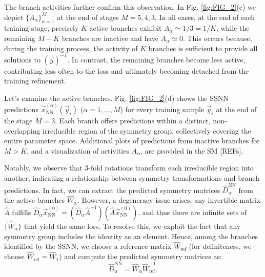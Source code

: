The branch activities further confirm this observation. In Fig. \ref{fig:FIG_2}(c) we depict $\{ A_{\alpha} \}_{\alpha = 1}^M$ at the end of stages $M = 5,4,3$.  In all cases, at the end of each training stage, precisely $K$ active branches exhibit $A_{\alpha} \simeq 1/3 = 1/K$, while the remaining $M-K$ branches are inactive and have $A_{\alpha} \simeq 0$.  This occurs because, during the training process, the activity of $K$ branches is sufficient to provide all solutions to $(\vec{y})^{-1}$. In contrast, the remaining branches become less active, contributing less often to the loss and ultimately becoming detached from the training refinement.

Let's examine the active branches. Fig. \ref{fig:FIG_2}(d) shows the SSNN predictions $\vec{x}^{(\alpha)}_{\mathrm{NN}}(\vec{y}_i)$ ($\alpha = 1,...,M$) for every training sample $\vec{y}_i$ at the end of the stage $M=3$.  Each branch offers predictions within a distinct, non-overlapping irreducible region of the symmetry group, collectively covering the entire parameter space.  Additional plots of predictions from inactive branches for $M>K$, and a visualization of activities $A_{\alpha}$, are provided in the SM [REFs].

Notably, we observe that 3-fold rotations transform each irreducible region into another, indicating a relationship between symmetry transformations and branch predictions.  In fact, we can extract the predicted symmetry matrices $\hat{D}_{\alpha}^{\mathrm{NN}}$ from the active branches $\hat{W}_{\alpha}$. 
However, a degeneracy issue arises: any invertible matrix $\hat{A}$ fulfills $\hat{D}_{\alpha} \vec{x}^{(0)}_{\mathrm{NN}} = (\hat{D}_{\alpha}\hat{A}^{-1})(\hat{A}\vec{x}^{(0)}_{\mathrm{NN}})$, and thus there are infinite sets of  $ \{ \hat{W}_{\alpha} \}$ that yield the same loss.  To resolve this, we exploit the fact that any symmetry group includes the identity as an element. Hence, among the branches identified by the SSNN, we choose a reference matrix $\hat{W}_{\mathrm{ref}}$ (for definiteness, we choose $\hat{W}_{\mathrm{ref}} = \hat{W}_1$) and compute the predicted symmetry matrices as:
%
\begin{equation} 
    \hat{D}^{\mathrm{NN}}_{\alpha} = \hat{W}_{\alpha} \hat{W}_{\mathrm{ref}}^{-1}.
\end{equation}

